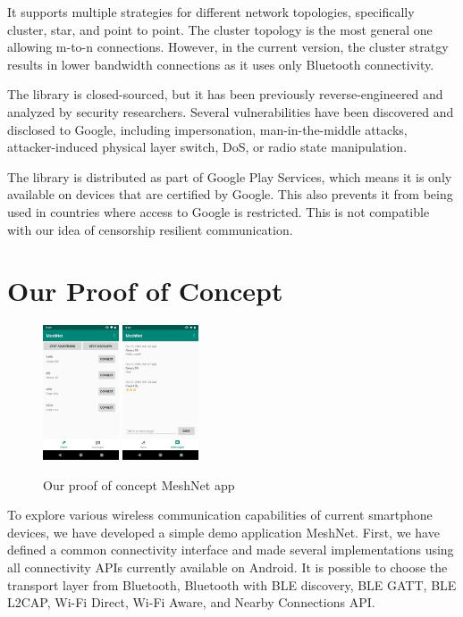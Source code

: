 \documentclass[conference,compsoc]{IEEEtran}
\begin{document}
It supports multiple strategies for different network topologies, specifically cluster, star, and point to point. The cluster topology is the most general one allowing m-to-n connections. However, in the current version, the cluster stratgy results in lower bandwidth connections as it uses only Bluetooth connectivity.

The library is closed-sourced, but it has been previously reverse-engineered and analyzed by security researchers. Several vulnerabilities have been discovered and disclosed to Google, including impersonation, man-in-the-middle attacks, attacker-induced physical layer switch, DoS, or radio state manipulation. \cite{nearbytr}

The library is distributed as part of Google Play Services, which means it is only available on devices that are certified by Google. This also prevents it from being used in countries where access to Google is restricted. This is not compatible with our idea of censorship resilient communication.


\section{Our Proof of Concept} \label{poc}

\begin{figure}[h]
  \centering
  \includegraphics[width=0.2\textwidth]{meshnet1} \includegraphics[width=0.2\textwidth]{meshnet2}
  \caption{Our proof of concept MeshNet app}
\end{figure}


To explore various wireless communication capabilities of current smartphone devices, we have developed a simple demo application MeshNet. First, we have defined a common connectivity interface and made several implementations using all connectivity APIs currently available on Android. It is possible to choose the transport layer from Bluetooth, Bluetooth with BLE discovery, BLE GATT, BLE L2CAP, Wi-Fi Direct, Wi-Fi Aware, and Nearby Connections API.
\end{document}
